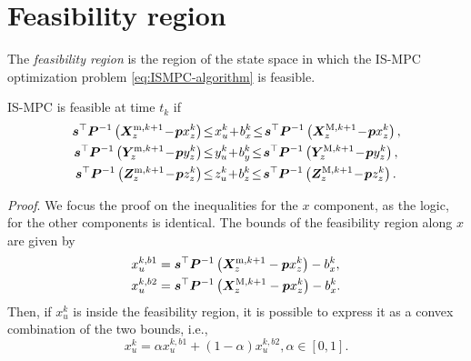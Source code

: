 \section{Feasibility region}
\label{sec:ISMPC:feasibility-region}

The {\em feasibility region} is the region of the state space in which the
IS-MPC optimization problem \eqref{eq:ISMPC-algorithm} is feasible.

\begin{proposition}
\label{prop:feasibility}
IS-MPC is feasible at time $t_k$ if
\begin{equation}
    \label{eq:FAPA:mpc-feasibility-constraint}
    \begin{aligned}
    \bm{s}^\top \bm{P}^{-1} \left(\bm{X}_z^{{\rm m}, k+1} \!-\! \bm{p} x_z^k\right)  \!&\le\! x_u^k \!+\! b_x^k \!\le\! \bm{s}^\top \bm{P}^{-1} \left(\bm{X}_z^{{\rm M}, k+1} \!-\! \bm{p} x_z^k\right),\\
    \bm{s}^\top \bm{P}^{-1} \left(\bm{Y}_z^{{\rm m}, k+1} \!-\! \bm{p} y_z^k\right)  \!&\le\! y_u^k \!+\! b_y^k \!\le\! \bm{s}^\top \bm{P}^{-1} \left(\bm{Y}_z^{{\rm M}, k+1} \!-\! \bm{p} y_z^k\right),\\
    \bm{s}^\top \bm{P}^{-1} \left(\bm{Z}_z^{{\rm m}, k+1} \!-\! \bm{p} z_z^k\right)  \!&\le\! z_u^k \!+\! b_z^k \!\le\! \bm{s}^\top \bm{P}^{-1} \left(\bm{Z}_z^{{\rm M}, k+1} \!-\! \bm{p} z_z^k\right).
    \end{aligned}
\end{equation}
\end{proposition}
{\em Proof}.
We focus the proof on the inequalities for the $x$ component, as the logic, for
the other components is identical. The bounds of the feasibility region along
$x$ are given by
\begin{align*}
x_u^{k,b1} &= \bm{s}^\top \bm{P}^{-1} \left(\bm{X}_z^{{\rm m}, k+1} - \bm{p} x_z^k\right) - b_x^k, \\
x_u^{k,b2} &= \bm{s}^\top \bm{P}^{-1} \left(\bm{X}_z^{{\rm M}, k+1} - \bm{p} x_z^k\right) - b_x^k.
\end{align*}
Then, if $x_u^k$ is inside the feasibility region, it is possible to express
it as a convex combination of the two bounds, i.e.,
\begin{equation}\label{eq:FAPA:xu_convex}
x_u^k = \alpha x_u^{k,b1} + (1-\alpha)x_u^{k,b2}, \alpha \in [0, 1].
\end{equation}

